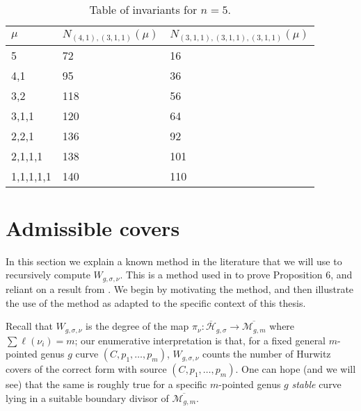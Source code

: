 \documentclass[11pt]{article}           %
\newcommand{\Hb}{\overline{\mathcal H}}
\theoremstyle{definition}
\begin{document}
  \begin{table}[h]
    \caption{Table of invariants for $n=5$.}
    \centering
    ~\\
\begin{tabular}{|l|l|l|}
\hline
$\mu$             & $N_{(4,1),(3,1,1)}(\mu)$ & $N_{(3,1,1),(3,1,1),(3,1,1)}(\mu)$ \\ \hline
{5} & {72}                                       & {16}                    \\ \hline
4,1                     & {95}                                       & {36}                    \\ \hline
3,2                     & {118}                                      & {56}                    \\ \hline
3,1,1                   & {120}                                      & {64}                    \\ \hline
2,2,1                   & {136}                                      & {92}                    \\ \hline
2,1,1,1                 & {138}                                      & {101}                   \\ \hline
1,1,1,1,1               & {140}                                      & 110                                        \\ \hline
\end{tabular}
\end{table}

\section{Admissible covers}
\label{section:admissible}

In this section we explain a known method in the literature that we will use
to recursively compute $W_{g,\sigma,\nu}$. This is a method used in \cite{Generalized} to prove Proposition 6, and reliant on a result from \cite{Lian}. We begin by motivating the method, and then illustrate the use of the method as adapted to the specific context of this thesis.

Recall that $W_{g,\sigma,\nu}$ is the degree of the map $\pi_{\nu}:\Hb_{g,\sigma}\to\overline{\mathcal M_{g,m}}$
where $\sum\ell(\nu_i)=m$; our enumerative interpretation is that, for a fixed general $m$-pointed genus $g$ curve $(C,p_1,\dots,p_m)$, $W_{g,\sigma,\nu}$ counts the number of Hurwitz covers of the correct form with source $(C,p_1,\dots,p_m)$. One can hope (and we will see) that the same is roughly true for
a specific $m$-pointed genus $g$ {\it stable} curve lying in a suitable boundary divisor of $\overline{\mathcal M_{g,m}}$.
\end{document}
